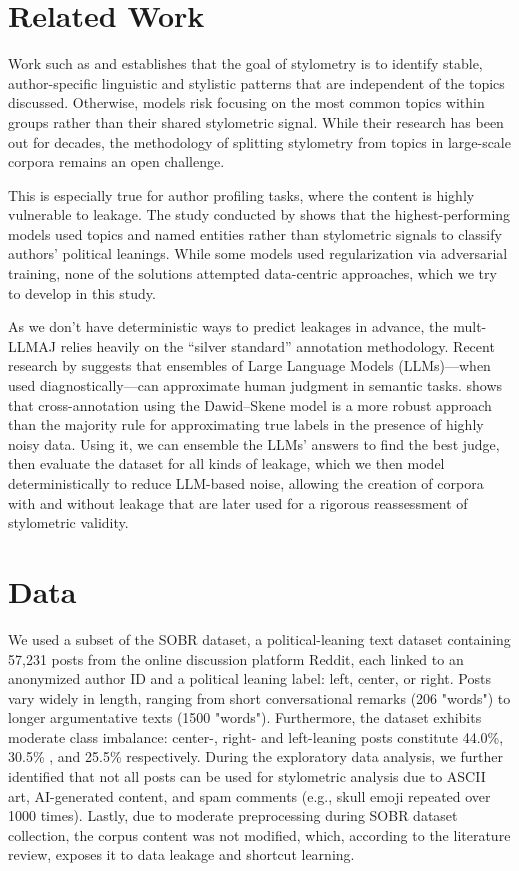 \documentclass[11pt]{article}
\begin{document}
\section{Related Work}
Work such as \citet{kopel_2009} and \citet{stomatatos_2009} establishes that the goal of stylometry is to identify stable, author-specific linguistic and stylistic patterns that are independent of the topics discussed. Otherwise, models risk focusing on the most common topics within groups rather than their shared stylometric signal. While their research has been out for decades, the methodology of splitting stylometry from topics in large-scale corpora remains an open challenge.

This is especially true for author profiling tasks, where the content is highly vulnerable to leakage. The study conducted by \citet{political_leaning_overexposure} shows that the highest-performing models used topics and named entities rather than stylometric signals to classify authors' political leanings. While some models used regularization via adversarial training, none of the solutions attempted data-centric approaches, which we try to develop in this study.

As we don’t have deterministic ways to predict leakages in advance, the mult-LLMAJ relies heavily on the “silver standard” annotation methodology. Recent research by \citet{llm_vs_human} suggests that ensembles of Large Language Models (LLMs)—when used diagnostically—can approximate human judgment in semantic tasks. \citet{dw_benefits} shows that cross-annotation using the Dawid–Skene model \citet{dw_original} is a more robust approach than the majority rule for approximating true labels in the presence of highly noisy data. Using it, we can ensemble the LLMs' answers to find the best judge, then evaluate the dataset for all kinds of leakage, which we then model deterministically to reduce LLM-based noise, allowing the creation of corpora with and without leakage that are later used for a rigorous reassessment of stylometric validity.

\section{Data}
We used a subset of the \citet{reddit_dataset} SOBR dataset, a political-leaning text dataset containing 57,231 posts from the online discussion platform Reddit, each linked to an anonymized author ID and a political leaning label: left, center, or right. Posts vary widely in length, ranging from short conversational remarks (206 "words") to longer argumentative texts (1500 "words"). Furthermore, the dataset exhibits moderate class imbalance: center-, right- and left-leaning posts constitute 44.0\%, 30.5\% , and 25.5\% respectively. During the exploratory data analysis, we further identified that not all posts can be used for stylometric analysis due to ASCII art, AI-generated content, and spam comments (e.g., skull emoji repeated over 1000 times).
Lastly, due to moderate preprocessing during SOBR dataset collection, the corpus content was not modified, which, according to the literature review, exposes it to data leakage and shortcut learning.
\end{document}
